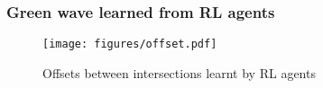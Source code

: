 

\subsubsection{Green wave learned from RL agents}

\begin{figure}[htb]
  \centering
	\texttt{[image: figures/offset.pdf]}
     \caption{Offsets between intersections learnt by RL agents}   
    \label{fig:case-study}
\end{figure}

